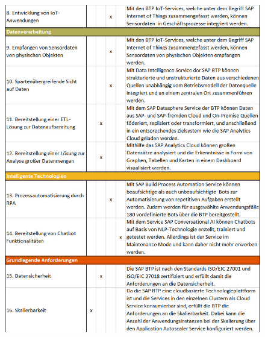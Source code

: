 \FloatBarrier

\begin{figure}[ht]
    \centering
    \includegraphics[width=1\textwidth]{img/TTFTeil2E.jpg}
    \label{fig:TTFTeil2}
\end{figure}

\FloatBarrier

